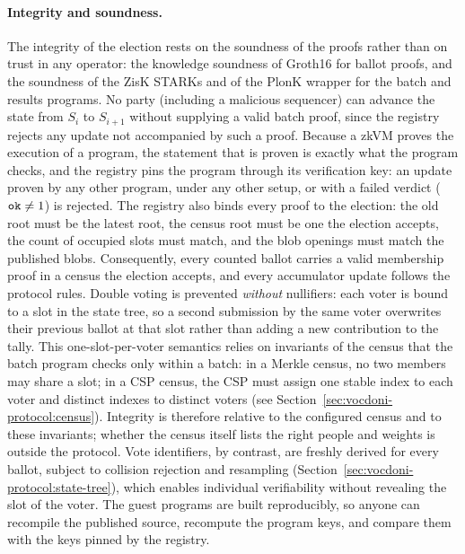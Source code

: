 \paragraph{Integrity and soundness.} The integrity of the election rests on the soundness of the proofs rather than on trust in any operator: the knowledge soundness of Groth16 for ballot proofs, and the soundness of the ZisK \acp{STARK} and of the PlonK wrapper for the batch and results programs. No party (including a malicious sequencer) can advance the state from $S_i$ to $S_{i+1}$ without supplying a valid batch proof, since the registry rejects any update not accompanied by such a proof. Because a \ac{zkVM} proves the execution of a program, the statement that is proven is exactly what the program checks, and the registry pins the program through its verification key: an update proven by any other program, under any other setup, or with a failed verdict ($\texttt{ok} \ne 1$) is rejected. The registry also binds every proof to the election: the old root must be the latest root, the census root must be one the election accepts, the count of occupied slots must match, and the blob openings must match the published blobs. Consequently, every counted ballot carries a valid membership proof in a census the election accepts, and every accumulator update follows the protocol rules. Double voting is prevented \emph{without} nullifiers: each voter is bound to a slot in the state tree, so a second submission by the same voter overwrites their previous ballot at that slot rather than adding a new contribution to the tally. This one-slot-per-voter semantics relies on invariants of the census that the batch program checks only within a batch: in a Merkle census, no two members may share a slot; in a \ac{CSP} census, the \ac{CSP} must assign one stable index to each voter and distinct indexes to distinct voters (see Section~\ref{sec:vocdoni-protocol:census}). Integrity is therefore relative to the configured census and to these invariants; whether the census itself lists the right people and weights is outside the protocol. Vote identifiers, by contrast, are freshly derived for every ballot, subject to collision rejection and resampling (Section~\ref{sec:vocdoni-protocol:state-tree}), which enables individual verifiability without revealing the slot of the voter. The guest programs are built reproducibly, so anyone can recompile the published source, recompute the program keys, and compare them with the keys pinned by the registry.

